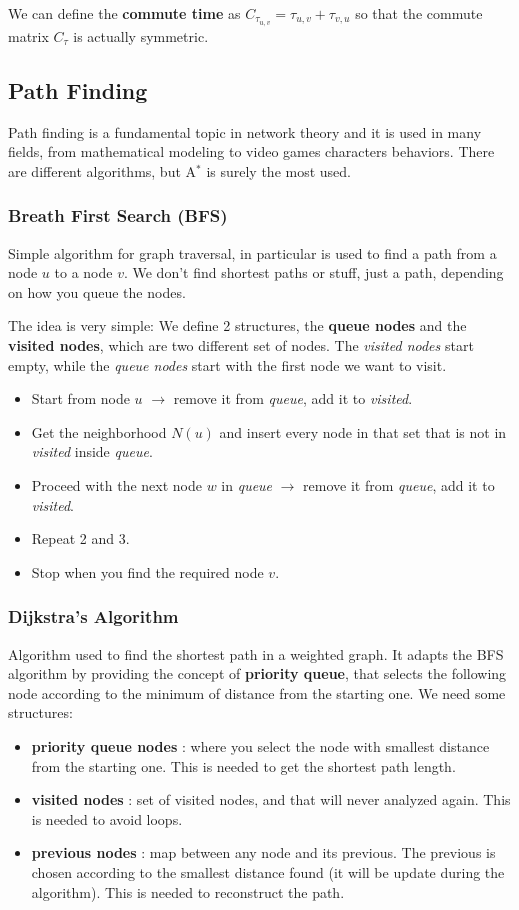 \documentclass[12pt,a4paper]{article}
\begin{document}
We can define the \textbf{commute time} as $C_{\tau_{u,v}} = \tau_{u,v}+\tau_{v,u}$ so that the commute matrix $C_\tau$ is actually symmetric.

\subsection{Path Finding}
Path finding is a fundamental topic in network theory and it is used in many fields, from mathematical modeling to video games characters behaviors. There are different algorithms, but A$^*$ is surely the most used.

\subsubsection*{Breath First Search (BFS)}
Simple algorithm for graph traversal, in particular is used to find a path from a node $u$ to a node $v$. We don't find shortest paths or stuff, just a path, depending on how you queue the nodes.

The idea is very simple:
We define 2 structures, the \textbf{queue nodes} and the \textbf{visited nodes}, which are two different set of nodes. The \textit{visited nodes} start empty, while the \textit{queue nodes} start with the first node we want to visit. 
\begin{itemize}
	\item Start from node $u$ $\rightarrow$ remove it from \textit{queue}, add it to \textit{visited}.
	\item Get the neighborhood $N(u)$ and insert every node in that set that is not in \textit{visited} inside \textit{queue}.
	\item Proceed with the next node $w$ in \textit{queue} $\rightarrow$ remove it from \textit{queue}, add it to \textit{visited}.
	\item Repeat 2 and 3.
	\item Stop when you find the required node $v$.
\end{itemize}

\subsubsection*{Dijkstra's Algorithm}
Algorithm used to find the shortest path in a weighted graph. It adapts the BFS algorithm by providing the concept of \textbf{priority queue}, that selects the following node according to the minimum of distance from the starting one.
We need some structures:
\begin{itemize}
	\item \textbf{priority queue nodes} : where you select the node with smallest distance from the starting one. This is needed to get the shortest path length.
	\item \textbf{visited nodes} : set of visited nodes, and that will never analyzed again. This is needed to avoid loops.
	\item \textbf{previous nodes} : map between any node and its previous. The previous is chosen according to the smallest distance found (it will be update during the algorithm). This is needed to reconstruct the path.
\end{itemize}
\end{document}
